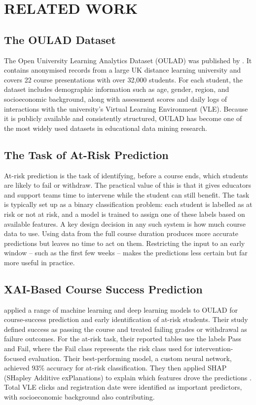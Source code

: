 \section{RELATED WORK}

\subsection{The OULAD Dataset}

The Open University Learning Analytics Dataset (OULAD) was published by \textcite{kuzilek2017oulad}. It contains anonymised records from a large UK distance learning university and covers 22 course presentations with over 32,000 students. For each student, the dataset includes demographic information such as age, gender, region, and socioeconomic background, along with assessment scores and daily logs of interactions with the university's Virtual Learning Environment (VLE). Because it is publicly available and consistently structured, OULAD has become one of the most widely used datasets in educational data mining research.

\subsection{The Task of At-Risk Prediction}

At-risk prediction is the task of identifying, before a course ends, which students are likely to fail or withdraw. The practical value of this is that it gives educators and support teams time to intervene while the student can still benefit. The task is typically set up as a binary classification problem: each student is labelled as at risk or not at risk, and a model is trained to assign one of these labels based on available features. A key design decision in any such system is how much course data to use. Using data from the full course duration produces more accurate predictions but leaves no time to act on them. Restricting the input to an early window -- such as the first few weeks -- makes the predictions less certain but far more useful in practice.

\subsection{XAI-Based Course Success Prediction}

\textcite{ujkani2024oulad} applied a range of machine learning and deep learning models to OULAD for course-success prediction and early identification of at-risk students. Their study defined success as passing the course and treated failing grades or withdrawal as failure outcomes. For the at-risk task, their reported tables use the labels Pass and Fail, where the Fail class represents the risk class used for intervention-focused evaluation. Their best-performing model, a custom neural network, achieved 93\% accuracy for at-risk classification. They then applied SHAP (SHapley Additive exPlanations) to explain which features drove the predictions \parencite{lundberg2017unified}. Total VLE clicks and registration date were identified as important predictors, with socioeconomic background also contributing.

